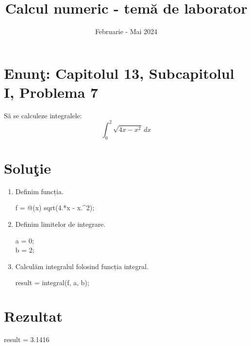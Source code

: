 \documentclass{article}
\begin{document}
\title{Calcul numeric - tem\u{a} de laborator}

\author{}

\date{Februarie - Mai 2024}

\maketitle              %








\section*{Enun\c{t}: Capitolul 13, Subcapitolul I, Problema 7}

S\u{a} se calculeze integralele:
\[
\int_{0}^{2} \sqrt{4x - x^2} \, dx
\]

\section*{Solu\c{t}ie}

\begin{center}
\begin{enumerate}
\item  Definim funcția. \\
\begin{center}
f = @(x) sqrt(4.*x - x.\^{}2);
\end{center}
\item Definim limitelor de integrare. \\
 \begin{center}
    a = 0;\\
    b = 2;
 \end{center}
\item Calculăm integralul folosind funcția integral.\\
 \begin{center}
     result = integral(f, a, b);
 \end{center}
\end{enumerate}
\end{center}

\section*{Rezultat}
\begin{center}
result = 3.1416
\end{center}
\end{document}
